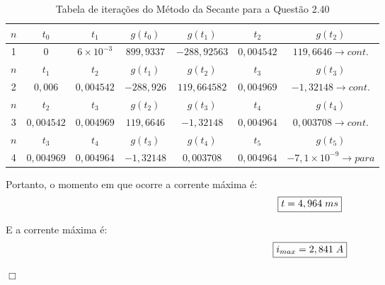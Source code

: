 \documentclass[
	12pt,				%
	oneside,			%
	a4paper,			%
	english,			%
	french,				%
	spanish,			%
	brazil				%
	]{abntex2}
\begin{document}
\begin{table}[!htb]
	\centering
	\begin{tabular}{c|c|c|c|c|c|c}
		\hline		
		$n$ & $t_0$ & $t_1$ & $g(t_0)$ & $g(t_1)$ & $t_2$ & $g(t_2)$\\
		\hline
		1 & 0 & $6\times 10^{-3}$ & $899,9337$ & $-288,92563$ & $0,004542$ & $119,6646 \rightarrow cont.$ \\
		\hline
		\hline
		$n$ & $t_1$ & $t_2$ & $g(t_1)$ & $g(t_2)$ & $t_3$ & $g(t_3)$ \\
		\hline
		2 & $0,006$ & $0,004542$ & $-288,926$ & $119,664582$ & $0,004969$ & $-1,32148\rightarrow cont.$ \\
		\hline
		\hline
		$n$ & $t_2$ & $t_3$ & $g(t_2)$ & $g(t_3)$ & $t_4$ & $g(t_4)$\\
		\hline
		3 & $0,004542$ & $0,004969$ & $119,6646$ & $-1,32148$ & $0,004964$ & $0,003708\rightarrow cont.$ \\
		\hline
		\hline
		$n$ & $t_3$ & $t_4$ & $g(t_3)$ & $g(t_4)$ & $t_5$ & $g(t_5)$\\
		\hline
		4 & $0,004969$ & $0,004964$ & $-1,32148$ & $0,003708$ & $0,004964$ & $-7,1\times 10^{-9}\rightarrow para$ \\
		\hline
	\end{tabular}
	\caption{Tabela de iterações do Método da Secante para a Questão 2.40}
	\label{tabela-2}
\end{table}

Portanto, o momento em que ocorre a corrente máxima é:
\begin{equation}
    \fbox{$t=4,964\;ms$}
\end{equation}

E a corrente máxima é:
\begin{equation}
    \fbox{$i_{max}=2,841\;A$}
\end{equation}

\begin{flushright}
    $\Box$
\end{flushright}
\newpage


\postextual


\end{document}
